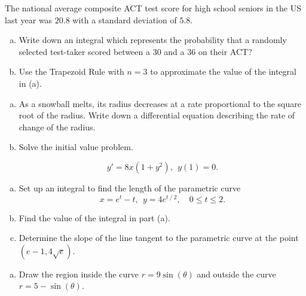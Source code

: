 \documentclass[11pt]{exam}
\theoremstyle{definition}
\begin{document}
\begin{questions}

\addpoints

\question[10]\mbox{}

The national average composite ACT test score for high school seniors in the US last year was $20.8$ with a standard deviation of $5.8$.
\begin{enumerate}[(a)]
\item  Write down an integral which represents the probability that a randomly selected test-taker scored between a $30$ and a $36$ on their ACT?
\vspace{2in}
\item  Use the Trapezoid Rule with $n=3$ to approximate the value of the integral in (a).
\end{enumerate}


\newpage
\question[10]\mbox{} 

\begin{enumerate}[(a)]
\item  

As a snowball melts, its radius decreases at a rate proportional to the square root of the radius.  Write down a differential equation describing the rate of change of the radius.

\vspace{4in}
\item 

Solve the initial value problem.

$$y' = 8x(1+y^2),\ \ y(1)=0.$$
\end{enumerate}



\newpage
\question[10]\mbox{} 


\begin{enumerate}[(a)]
\item  Set up an integral to find the length of the parametric curve
$$x = e^t - t,\ \ y = 4e^{t⁄2},\quad 0\leq t\leq 2.$$
\vspace{2in}
\item Find the value of the integral in part (a).
\vspace{3in}
\item Determine the slope of the line tangent to the parametric curve at the point $(e-1,4\sqrt{e})$.
\end{enumerate}

\newpage
\question[10]\mbox{} 

\begin{enumerate}[(a)]
\item
Draw the region inside the curve $r=9\sin(\theta)$ and outside the curve $r=5-\sin(\theta)$.


\end{enumerate}
\end{questions}
\end{document}
